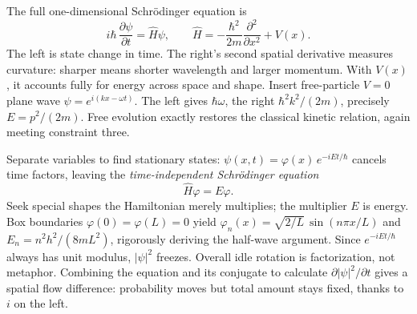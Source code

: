 \begin{center}
\end{center}

\begin{mathbridge}
The full one-dimensional Schrödinger equation is
\[
  i\hbar\,\frac{\partial\psi}{\partial t}
  =\hat{H}\psi,\qquad
  \hat{H}=-\frac{\hbar^{2}}{2m}\frac{\partial^{2}}{\partial x^{2}}+V(x).
\]
The left is state change in time. The right's second spatial derivative measures curvature: sharper means shorter wavelength and larger momentum. With \(V(x)\), it accounts fully for energy across space and shape. Insert free-particle \(V=0\) plane wave \(\psi=e^{i(kx-\omega t)}\). The left gives \(\hbar\omega\), the right \(\hbar^{2}k^{2}/(2m)\), precisely \(E=p^{2}/(2m)\). Free evolution exactly restores the classical kinetic relation, again meeting constraint three.

Separate variables to find stationary states: \(\psi(x,t)=\varphi(x)\,e^{-iEt/\hbar}\) cancels time factors, leaving the \emph{time-independent Schrödinger equation}
\[
  \hat{H}\varphi=E\varphi .
\]
Seek special shapes the Hamiltonian merely multiplies; the multiplier \(E\) is energy. Box boundaries \(\varphi(0)=\varphi(L)=0\) yield \(\varphi_{n}(x)=\sqrt{2/L}\,\sin(n\pi x/L)\) and \(E_{n}=n^{2}h^{2}/(8mL^{2})\), rigorously deriving the half-wave argument. Since \(e^{-iEt/\hbar}\) always has unit modulus, \(|\psi|^{2}\) freezes. Overall idle rotation is factorization, not metaphor. Combining the equation and its conjugate to calculate \(\partial|\psi|^{2}/\partial t\) gives a spatial flow difference: probability moves but total amount stays fixed, thanks to \(i\) on the left.
\end{mathbridge}

